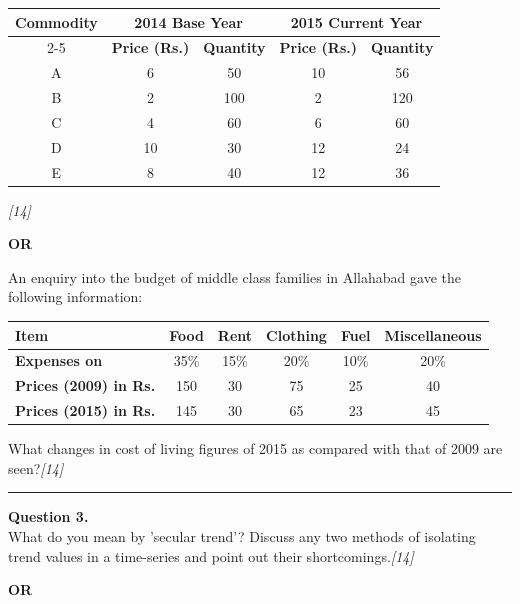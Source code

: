 \documentclass[11pt,a4paper]{article}
\newcommand{\pts}[1]{\hfill   \textit{[#1]}}
\begin{document}
\begin{center}
\small

\begin{tabular}{|c|c|c||c|c|}
\hline
   \textbf{Commodity} & \multicolumn{2}{c||}{   \textbf{2014 Base Year}} & \multicolumn{2}{c|}{   \textbf{2015 Current Year}} \\
\cline{2-5}
&   \textbf{Price (Rs.)} &   \textbf{Quantity} &   \textbf{Price (Rs.)} &   \textbf{Quantity} \\
\hline
A & 6 & 50 & 10 & 56 \\
B & 2 & 100 & 2 & 120 \\
C & 4 & 60 & 6 & 60 \\
D & 10 & 30 & 12 & 24 \\
E & 8 & 40 & 12 & 36 \\
\hline
\end{tabular}
\end{center}\pts{14}

\centerline{   \textbf{OR}}

An enquiry into the budget of middle class families in Allahabad gave the following information:


\begin{center}
\small

\begin{tabular}{|l|c|c|c|c|c|}
\hline
   \textbf{Item} &   \textbf{Food} &   \textbf{Rent} &   \textbf{Clothing} &   \textbf{Fuel} &   \textbf{Miscellaneous} \\
\hline
   \textbf{Expenses on} & 35\% & 15\% & 20\% & 10\% & 20\% \\
   \textbf{Prices (2009) in Rs.} & 150 & 30 & 75 & 25 & 40 \\
   \textbf{Prices (2015) in Rs.} & 145 & 30 & 65 & 23 & 45 \\
\hline
\end{tabular}
\end{center}

What changes in cost of living figures of 2015 as compared with that of 2009 are seen?\pts{14}

\medskip\rule{\linewidth}{0.2pt}

\pagebreak




\noindent   \textbf{Question 3.} \\
What do you mean by 'secular trend'? Discuss any two methods of isolating trend values in a time-series and point out their shortcomings.\pts{14}

\centerline{   \textbf{OR}}
\end{document}
